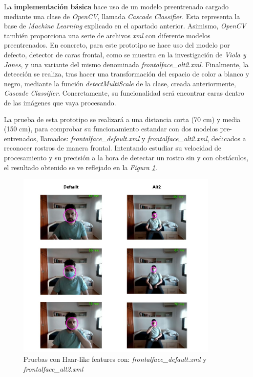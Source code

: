 La \textbf{implementación básica} hace uso de un modelo preentrenado cargado mediante una clase de \textit{OpenCV}, llamada \textit{Cascade Classifier}. Esta representa la base de \textit{Machine Learning} explicado en el apartado anterior. Asimismo, \textit{OpenCV} también proporciona una serie de archivos \textit{xml} con diferente modelos preentrenados. En concreto, para este prototipo se hace uso del modelo por defecto, detector de caras frontal, como se muestra en la investigación de \textit{Viola y Jones}, y una variante del mismo denominada \textit{frontalface\_alt2.xml}. Finalmente, la detección se realiza, tras hacer una transformación del espacio de color a blanco y negro, mediante la función \textit{detectMultiScale} de la clase, creada anteriormente, \textit{Cascade Classifier}. Concretamente, su funcionalidad será encontrar caras dentro de las imágenes que vaya procesando.

La prueba de esta prototipo se realizará a una distancia corta (70 cm)  y media (150 cm), para comprobar su funcionamiento estandar con dos modelos pre-entrenados, llamados:  \textit{frontalface\_default.xml} y \textit{frontalface\_alt2.xml}, dedicados a reconocer rostros de manera frontal. Intentando estudiar su velocidad de procesamiento y su precisión a la hora de detectar un rostro sin y con obstáculos, el resultado obtenido se ve reflejado en la \textit{Figura \ref{fig:haar1}}.

\begin{figure}[htp]
	\centering
	\includegraphics[width=10cm]{imagenes/prueba_proto1.jpg}
	\caption[Pruebas con Haar-like features con: \textit{frontalface\_default.xml} y \newline \textit{frontalface\_alt2.xml}]{Pruebas con Haar-like features con: \textit{frontalface\_default.xml} y \textit{frontalface\_alt2.xml}}
	\label{fig:haar1}
\end{figure}

